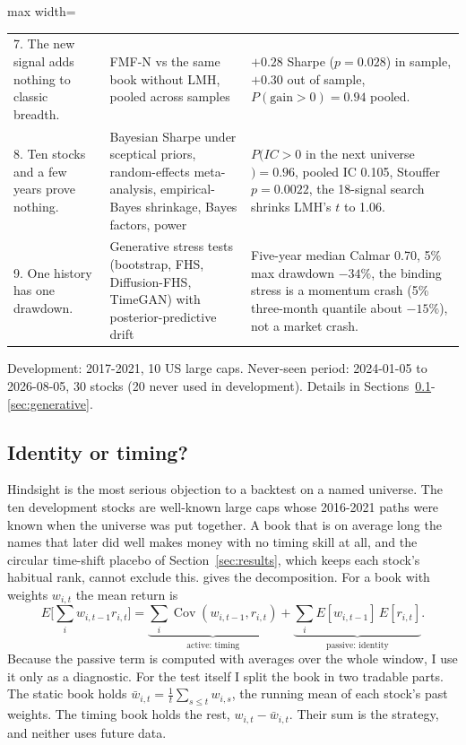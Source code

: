 \begin{table}[t]
\begin{adjustbox}{max width=\textwidth}
\begin{tabular}{p{}p{}p{}}
7. The new signal adds nothing to classic breadth. & FMF-N vs the same book without LMH, pooled across samples & $+0.28$ Sharpe ($p = 0.028$) in sample, $+0.30$ out of sample, $P(\text{gain}>0) = 0.94$ pooled.\\
8. Ten stocks and a few years prove nothing. & Bayesian Sharpe under sceptical priors, random-effects meta-analysis, empirical-Bayes shrinkage, Bayes factors, power & $P(IC>0$ in the next universe$) = 0.96$, pooled IC 0.105, Stouffer $p = 0.0022$, the 18-signal search shrinks LMH's $t$ to 1.06.\\
9. One history has one drawdown. & Generative stress tests (bootstrap, FHS, Diffusion-FHS, TimeGAN) with posterior-predictive drift & Five-year median Calmar 0.70, 5\% max drawdown $-34\%$, the binding stress is a momentum crash (5\% three-month quantile about $-15\%$), not a market crash.\\
\bottomrule
\end{tabular}\end{adjustbox}
\par\smallskip\begin{minipage}{0.95\textwidth}\scriptsize Development: 2017-2021, 10 US large caps. Never-seen period: 2024-01-05 to 2026-08-05, 30 stocks (20 never used in development). Details in Sections~\ref{sec:identity}-\ref{sec:generative}.\end{minipage}
\end{table}

\subsection{Identity or timing?}\label{sec:identity}

Hindsight is the most serious objection to a backtest on a named universe. The ten development stocks are well-known large caps whose 2016-2021 paths were known when the universe was put together. A book that is on average long the names that later did well makes money with no timing skill at all, and the circular time-shift placebo of Section~\ref{sec:results}, which keeps each stock's habitual rank, cannot exclude this. \citet{lo2008} gives the decomposition. For a book with weights $w_{i,t}$ the mean return is
\begin{equation}
E\Big[\sum_i w_{i,t-1}r_{i,t}\Big]=\underbrace{\sum_i \operatorname{Cov}(w_{i,t-1},r_{i,t})}_{\text{active: timing}}+\underbrace{\sum_i E[w_{i,t-1}]\,E[r_{i,t}]}_{\text{passive: identity}}.\label{eq:lo}
\end{equation}
Because the passive term is computed with averages over the whole window, I use it only as a diagnostic. For the test itself I split the book in two tradable parts. The static book holds $\bar w_{i,t}=\tfrac1t\sum_{s\le t}w_{i,s}$, the running mean of each stock's past weights. The timing book holds the rest, $w_{i,t}-\bar w_{i,t}$. Their sum is the strategy, and neither uses future data.


